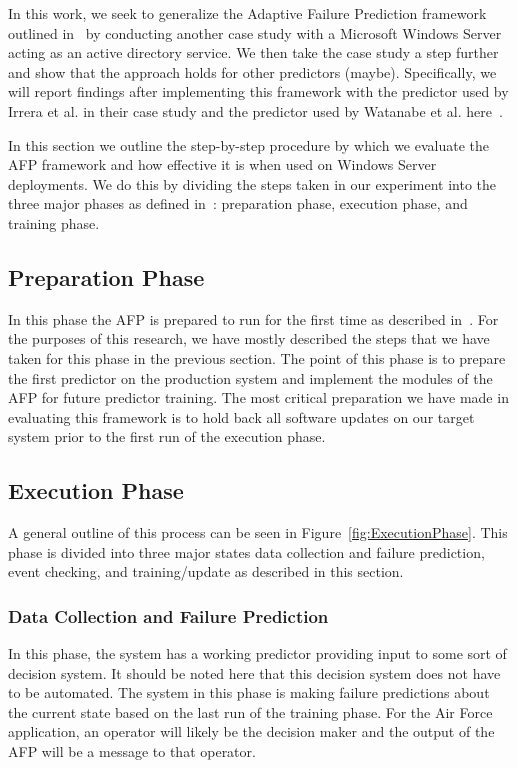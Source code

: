 In this work, we seek to generalize the Adaptive Failure Prediction framework
outlined in~\cite{irrera2015} by conducting another case study with a
Microsoft Windows Server acting as an active directory service.  We then take
the case study a step further and show that the approach holds for other
predictors (maybe).  Specifically, we will report findings after implementing
this framework with the predictor used by Irrera et al. in their case study and
the predictor used by Watanabe et al. here~\cite{watanabe2014}.

In this section we outline the step-by-step procedure by which we evaluate the
AFP framework and how effective it is when used on Windows Server deployments.
We do this by dividing the steps taken in our experiment into the three major
phases as defined in~\cite{irrera2015}: preparation phase, execution phase, and
training phase.

\subsection{Preparation Phase}
In this phase the AFP is prepared to run for the first time as described
in~\cite{irrera2015}.  For the purposes of this research, we have mostly
described the steps that we have taken for this phase in the previous section.
The point of this phase is to prepare the first predictor on the production
system and implement the modules of the AFP for future predictor training.  The
most critical preparation we have made in evaluating this framework is to hold
back all software updates on our target system prior to the first run of the
execution phase.

\subsection{Execution Phase}
A general outline of this process can be seen in
Figure~\ref{fig:ExecutionPhase}.  This phase is divided into three major states
data collection and failure prediction, event checking, and training/update as
described in this section.

\figExecutionPhase

\subsubsection{Data Collection and Failure Prediction}
In this phase, the system has a working predictor providing input to some sort
of decision system.  It should be noted here that this decision system does not
have to be automated.  The system in this phase is making failure predictions
about the current state based on the last run of the training phase.  For the
Air Force application, an operator will likely be the decision maker and the
output of the AFP will be a message to that operator.  

